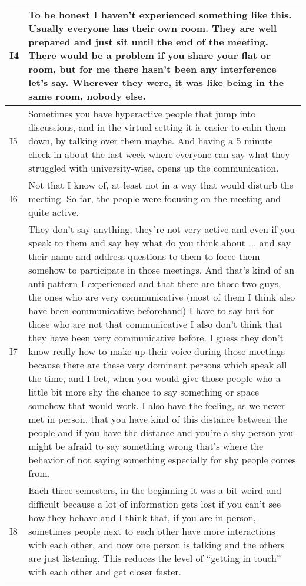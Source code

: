 \begin{longtable}{|  p{}  |  p{} |}
  \\
\hline
\vspace{-0.5cm} I4 & 
    To be honest I haven't experienced something like this. Usually everyone has their own room. They are well prepared and just sit until the end of the meeting. There would be a problem if you share your flat or room, but for me there hasn't been any interference let's say. Wherever they were, it was like being in the same room, nobody else.
  \\
\hline
\vspace{-0.5cm} I5 & 
 Sometimes you have hyperactive people that jump into discussions, and in the virtual setting it is easier to calm them down, by talking over them maybe. And having a 5 minute check-in about the last week where everyone can say what they struggled with university-wise, opens up the communication. 
\\
\hline
\vspace{-0.5cm} I6 & 
  Not that I know of, at least not in a way that would disturb the meeting. So far, the people were focusing on the meeting and quite active.
   \\
\hline
\vspace{-0.5cm} I7 & 
 They don't say anything, they're not very active and even if you speak to them and say hey what do you think about ... and say their name and address questions to them to force them somehow to participate in those meetings. And that's kind of an anti pattern I experienced and that there are those two guys, the ones who are very communicative (most of them I think also have been communicative beforehand) I have to say but for those who are not that communicative I also don't think that they have been very communicative before. I guess they don't know really how to make up their voice during those meetings because there are these very dominant persons which speak all the time, and I bet, when you would give those people who a little bit more shy the chance to say something or space somehow that would work. I also have the feeling, as we never met in person, that you have kind of this distance between the people and if you have the distance and you're a shy person you might be afraid to say something wrong that's where the behavior of not saying something especially for shy people comes from.
    \\
\hline
\vspace{-0.5cm} I8 & Each three semesters, in the beginning it was a bit weird and difficult because a lot of information gets lost if you can’t see how they behave and I think that, if you are in person, sometimes people next to each other have more interactions with each other, and now one person is talking and the others are just listening. This reduces the level of “getting in touch” with each other and get closer faster.

\end{longtable}
